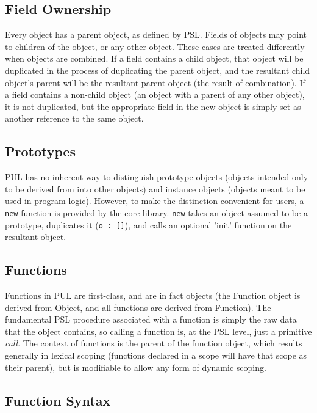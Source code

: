 \subsection{Field Ownership}

Every object has a parent object, as defined by PSL. Fields of objects may point to children of the object, or any other object. These cases are treated differently when objects are combined. If a field contains a child object, that object will be duplicated in the process of duplicating the parent object, and the resultant child object's parent will be the resultant parent object (the result of combination). If a field contains a non-child object (an object with a parent of any other object), it is not duplicated, but the appropriate field in the new object is simply set as another reference to the same object.



\subsection{Prototypes}

PUL has no inherent way to distinguish prototype objects (objects intended only to be derived from into other objects) and instance objects (objects meant to be used in program logic). However, to make the distinction convenient for users, a \texttt{new} function is provided by the core library. \texttt{new} takes an object assumed to be a prototype, duplicates it (\texttt{o : []}), and calls an optional 'init' function on the resultant object.



\subsection{Functions}

Functions in PUL are first-class, and are in fact objects (the Function object is derived from Object, and all functions are derived from Function). The fundamental PSL procedure associated with a function is simply the raw data that the object contains, so calling a function is, at the PSL level, just a primitive \textit{call}. The context of functions is the parent of the function object, which results generally in lexical scoping (functions declared in a scope will have that scope as their parent), but is modifiable to allow any form of dynamic scoping.



\subsection{Function Syntax}

